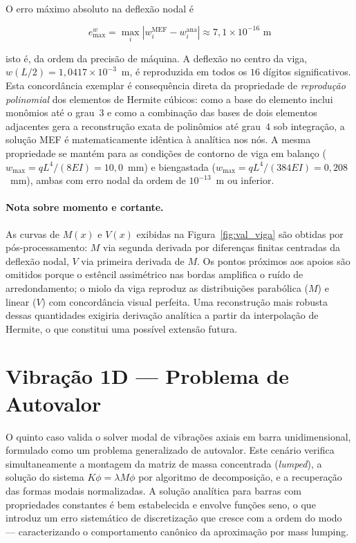 O erro máximo absoluto na deflexão nodal é

\begin{equation}
    e_{\max}^{w} = \max_{i} \left| w_i^{\text{MEF}} - w_i^{\text{ana}} \right| \approx 7{,}1 \times 10^{-16} \text{~m}
    \label{eq:val_viga_erro}
\end{equation}

\noindent isto é, da ordem da precisão de máquina. A deflexão no centro da viga, $w(L/2) = 1{,}0417 \times 10^{-3}$~m, é reproduzida em todos os $16$ dígitos significativos. Esta concordância exemplar é consequência direta da propriedade de \emph{reprodução polinomial} dos elementos de Hermite cúbicos: como a base do elemento inclui monômios até o grau~$3$ e como a combinação das bases de dois elementos adjacentes gera a reconstrução exata de polinômios até grau~$4$ sob integração, a solução MEF é matematicamente idêntica à analítica nos nós. A mesma propriedade se mantém para as condições de contorno de viga em balanço ($w_{\max} = qL^4/(8EI) = 10{,}0$~mm) e biengastada ($w_{\max} = qL^4/(384EI) = 0{,}208$~mm), ambas com erro nodal da ordem de $10^{-13}$~m ou inferior.

\paragraph{Nota sobre momento e cortante.} As curvas de $M(x)$ e $V(x)$ exibidas na Figura~\ref{fig:val_viga} são obtidas por pós-processamento: $M$ via segunda derivada por diferenças finitas centradas da deflexão nodal, $V$ via primeira derivada de $M$. Os pontos próximos aos apoios são omitidos porque o estêncil assimétrico nas bordas amplifica o ruído de arredondamento; o miolo da viga reproduz as distribuições parabólica ($M$) e linear ($V$) com concordância visual perfeita. Uma reconstrução mais robusta dessas quantidades exigiria derivação analítica a partir da interpolação de Hermite, o que constitui uma possível extensão futura.


\section{Vibração 1D --- Problema de Autovalor}
\label{sec:val_vibracao}

O quinto caso valida o solver modal de vibrações axiais em barra unidimensional, formulado como um problema generalizado de autovalor. Este cenário verifica simultaneamente a montagem da matriz de massa concentrada (\emph{lumped}), a solução do sistema $K \phi = \lambda M \phi$ por algoritmo de decomposição, e a recuperação das formas modais normalizadas. A solução analítica para barras com propriedades constantes é bem estabelecida e envolve funções seno, o que introduz um erro sistemático de discretização que cresce com a ordem do modo --- caracterizando o comportamento canônico da aproximação por mass lumping.

